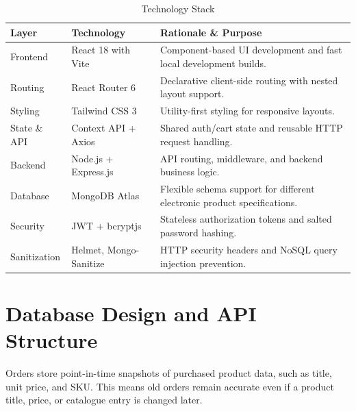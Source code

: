 \documentclass[12pt,a4paper,oneside]{report}
\begin{document}
\begin{table}[H]
\centering
\caption{Technology Stack}
\label{tab:tech_stack}
\begin{tabularx}{\textwidth}{lp{4cm}X}
\toprule
\textbf{Layer} & \textbf{Technology} & \textbf{Rationale \& Purpose} \\
\midrule
Frontend & React 18 with Vite & Component-based UI development and fast local development builds. \\
Routing & React Router 6 & Declarative client-side routing with nested layout support. \\
Styling & Tailwind CSS 3 & Utility-first styling for responsive layouts. \\
State \& API & Context API + Axios & Shared auth/cart state and reusable HTTP request handling. \\
Backend & Node.js + Express.js & API routing, middleware, and backend business logic. \\
Database & MongoDB Atlas & Flexible schema support for different electronic product specifications. \\
Security & JWT + bcryptjs & Stateless authorization tokens and salted password hashing. \\
Sanitization & Helmet, Mongo-Sanitize & HTTP security headers and NoSQL query injection prevention. \\
\bottomrule
\end{tabularx}
\end{table}

\section{Database Design and API Structure}
Orders store point-in-time snapshots of purchased product data, such as title, unit price, and SKU. This means old orders remain accurate even if a product title, price, or catalogue entry is changed later.
\end{document}
